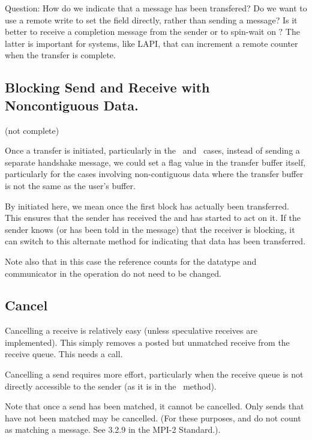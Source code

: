 \begin{via}
  Question: How do we indicate that a message has been transfered?  Do we want
  to use a remote write to set the  field
  directly, rather than sending a message?  Is it better to receive a
  completion message from the sender or to spin-wait on
  ?   The latter is important for systems,
  like LAPI, that can increment a remote counter when the transfer is
  complete.  

\end{via}

\subsection{Blocking Send and Receive with Noncontiguous Data.}
\label{sec:blocking-optimization}
(not complete)

Once a transfer is initiated, particularly in the \shmemname\ and 
\vianame\ cases, instead of sending a separate handshake message, we could set
a flag 
value in the transfer buffer itself, particularly for the cases involving
non-contiguous data where the transfer buffer is not the same as the user's
buffer.  

By initiated here, we mean once the first block has actually been
transferred.  This ensures that the sender has received the
 and has started to act on it.  If the sender
knows (or has been told in the  message) that
the receiver is blocking, it can switch to this alternate method for
indicating that data has been transferred.

Note also that in this case the reference counts for the datatype and
communicator in the operation do not need to be changed.

\subsection{Cancel}
Cancelling a receive is relatively easy (unless speculative receives
are implemented).   This simply removes a posted but unmatched receive
from the receive queue.  This needs a
 call.

Cancelling a send requires more effort, particularly when the receive
queue is not directly accessible to the sender (as it is in the
\shmemname\ method).  

Note that once a send has been matched, it cannot be cancelled.  Only sends
that have not been matched may be cancelled. (For these purposes,
 and  do not count as matching a
message.  See 3.2.9 in the MPI-2 Standard.).

